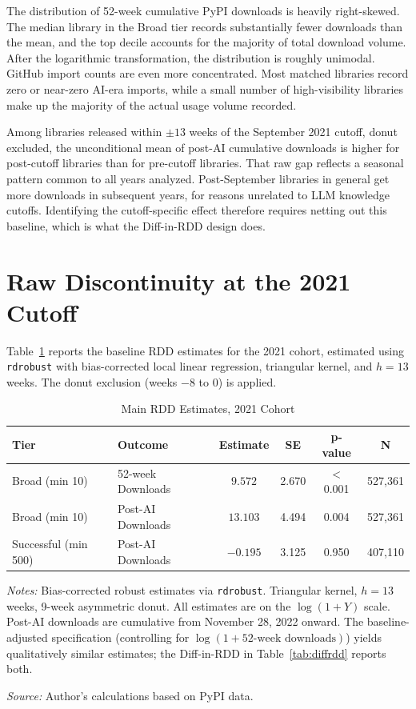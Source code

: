 \documentclass[12pt, a4paper]{report}
\begin{document}
The distribution of 52-week cumulative PyPI downloads is heavily right-skewed. The median library in the Broad tier records substantially fewer downloads than the mean, and the top decile accounts for the majority of total download volume. After the logarithmic transformation, the distribution is roughly unimodal. GitHub import counts are even more concentrated. Most matched libraries record zero or near-zero AI-era imports, while a small number of high-visibility libraries make up the majority of the actual usage volume recorded.

Among libraries released within $\pm 13$ weeks of the September 2021 cutoff, donut excluded, the unconditional mean of post-AI cumulative downloads is higher for post-cutoff libraries than for pre-cutoff libraries. That raw gap reflects a seasonal pattern common to all years analyzed. Post-September libraries in general get more downloads in subsequent years, for reasons unrelated to LLM knowledge cutoffs. Identifying the cutoff-specific effect therefore requires netting out this baseline, which is what the Diff-in-RDD design does.

\section{Raw Discontinuity at the 2021 Cutoff}\label{sec:results-mainrdd}
Table~\ref{tab:mainrdd} reports the baseline RDD estimates for the 2021 cohort, estimated using \texttt{rdrobust} with bias-corrected local linear regression, triangular kernel, and $h = 13$ weeks. The donut exclusion (weeks $-8$ to $0$) is applied.

\begin{table}[ht]
\centering
\caption{Main RDD Estimates, 2021 Cohort}\label{tab:mainrdd}
\small
\begin{tabular}{llcccc}
\toprule
\textbf{Tier} & \textbf{Outcome} & \textbf{Estimate} & \textbf{SE} & \textbf{p-value} & \textbf{N} \\ \midrule
Broad (min 10) & 52-week Downloads & $9.572$ & 2.670 & $<$0.001 & 527,361 \\
Broad (min 10) & Post-AI Downloads & $13.103$ & 4.494 & 0.004 & 527,361 \\
Successful (min 500) & Post-AI Downloads & $-0.195$ & 3.125 & 0.950 & 407,110 \\ \bottomrule
\end{tabular}
\begin{tablenotes}
\small
\item \textit{Notes:} Bias-corrected robust estimates via \texttt{rdrobust}. Triangular kernel, $h = 13$ weeks, 9-week asymmetric donut. All estimates are on the $\log(1+Y)$ scale. Post-AI downloads are cumulative from November 28, 2022 onward. The baseline-adjusted specification (controlling for $\log(1 + \text{52-week downloads})$) yields qualitatively similar estimates; the Diff-in-RDD in Table~\ref{tab:diffrdd} reports both.
\item \textit{Source:} Author's calculations based on PyPI data.
\end{tablenotes}
\end{table}
\end{document}
